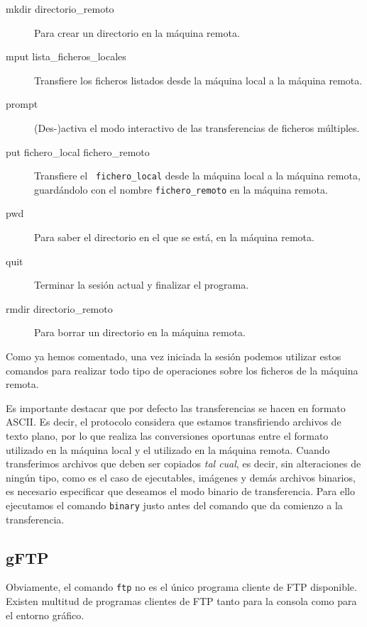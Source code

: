 \begin{description}
\item[mkdir directorio\_remoto] Para crear un directorio en la máquina
remota.

\item[mput lista\_ficheros\_locales] Transfiere  los ficheros listados
desde la máquina local a la máquina remota.

\item[prompt] (Des-)activa  el modo interactivo de  las transferencias
de ficheros múltiples.

\item[put   fichero\_local   fichero\_remoto]   Transfiere   el   {\tt
fichero\_local} desde la máquina local a la máquina remota, guardándolo
con el nombre {\tt fichero\_remoto} en la máquina remota.

\item[pwd] Para saber  el directorio en el que se  está, en la máquina
remota.

\item[quit] Terminar la sesión actual y finalizar el programa.

\item[rmdir  directorio\_remoto]  Para  borrar  un  directorio  en  la
máquina remota.

\end{description}

Como ya hemos  comentado, una vez iniciada la  sesión podemos utilizar
estos  comandos  para realizar  todo  tipo  de operaciones  sobre  los
ficheros de la máquina remota.

Es importante  destacar que  por defecto  las transferencias  se hacen
en  formato  ASCII.  Es  decir, el  protocolo  considera  que  estamos
transfiriendo  archivos  de  texto  plano,  por  lo  que  realiza  las
conversiones oportunas entre el formato  utilizado en la máquina local
y el utilizado en la  máquina remota. Cuando transferimos archivos que
deben  ser copiados  {\em tal  cual},  es decir,  sin alteraciones  de
ningún tipo, como es el caso de ejecutables, imágenes y demás archivos
binarios, es  necesario especificar  que deseamos  el modo  binario de
transferencia.  Para ello  ejecutamos  el comando  {\tt binary}  justo
antes del comando que da comienzo a la transferencia.

\subsection{gFTP}

Obviamente, el  comando {\tt ftp} no  es el único programa  cliente de
FTP disponible.  Existen multitud de  programas clientes de  FTP tanto
para la consola como para el entorno gráfico.

